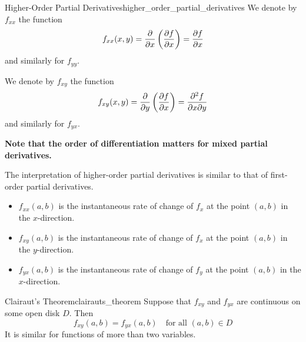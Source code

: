 \begin{definition}{Higher-Order Partial Derivatives}{higher_order_partial_derivatives}
We denote by $f_{xx}$ the function
\[
    f_{xx}(x, y) = \pdv{}{x} \left( \pdv{f}{x} \right) = \pdv{f}{x}
\]
and similarly for $f_{yy}$.

We denote by $f_{xy}$ the function
\[
    f_{xy}(x, y) = \pdv{}{y} \left( \pdv{f}{x} \right) = \pdv{f}{x}{y}
\]
and similarly for $f_{yx}$.

\textbf{Note that the order of differentiation matters for mixed partial derivatives.}
\end{definition}

The interpretation of higher-order partial derivatives is similar to that of first-order partial derivatives.
\begin{itemize}
    \item $f_{xx}(a, b)$ is the instantaneous rate of change of $f_x$ at the point $(a, b)$ in the $x$-direction.
    \item $f_{xy}(a, b)$ is the instantaneous rate of change of $f_x$ at the point $(a, b)$ in the $y$-direction.
    \item $f_{yx}(a, b)$ is the instantaneous rate of change of $f_y$ at the point $(a, b)$ in the $x$-direction.
\end{itemize}

\begin{theorem}{Clairaut's Theorem}{clairauts_theorem}
    Suppose that $f_{xy}$ and $f_{yx}$ are continuous on some open disk $D$. Then
    \[
        f_{xy}(a, b) = f_{yx}(a, b) \quad \text{for all } (a, b) \in D
    \]
    It is similar for functions of more than two variables.
\end{theorem}


